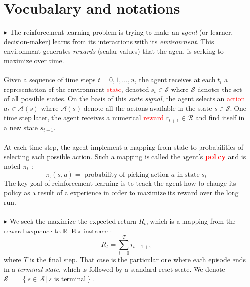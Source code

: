 \documentclass[a4paper]{article}
\begin{document}
	
		
	\vhrulefill{2pt}
	
	\tableofcontents
	
	\vhrulefill{2pt}
	
	\section{Vocubalary and notations}
	{
		\paragraph{} $\blacktriangleright$ The reinforcement learning problem is trying to make an \emph{agent} (or learner, decision-maker) learns from its interactions with its \emph{environment}. This environment generates \emph{rewards} (scalar values) that the agent is seeking to maximize over time. 
		
		\paragraph{} Given a sequence of time steps $t=0,1,\hdots,n$, the agent receives at each $t_i$ a representation of the environment \textcolor{red}{state}, denoted $s_t\in\mathcal{S}$ where $\mathcal{S}$ denotes the set of all possible states. On the basis of this \emph{state signal}, the agent selects an \textcolor{red}{action} $a_t \in\mathcal{A}(s)$ where $\mathcal{A}(s)$ denote all the actions available in the state $s\in\mathcal{S}$. One time step later, the agent receives a numerical \textcolor{red}{reward} $r_{t+1}\in\mathcal{R}$ and find itself in a new state $s_{t+1}$. 
		
	\paragraph{} At each time step, the agent implement a mapping from state to probabilities of selecting each possible action. Such a mapping is called the agent's \textbf{\textcolor{red}{policy}} and is noted $\pi_t$ : 
	\begin{equation}
		\pi_t(s,a) = \text{ probability of picking action } a \text{ in state } s_t
	\end{equation}
	The key goal of reinforcement learning is to teach the agent how to change its policy as a result of a experience in order to maximize its reward over the long run. 
	
	\paragraph{} $\blacktriangleright$ We seek the maximize the expected return $R_t$, which is a mapping from the reward sequence to $\mathbb{R}$. For instance : 
	\begin{equation}
		R_t = \sum_{i=0}^{T} r_{t+1+i}
	\end{equation}
	where $T$ is the final step. That case is the particular one where each episode ends in a \emph{terminal state}, which is followed by a standard reset state. We denote $\mathcal{S}^+=\left\{ s \in\ \mathcal{S} \, \vert \, s \text{ is terminal}\right\}$.
	
}
\end{document}
